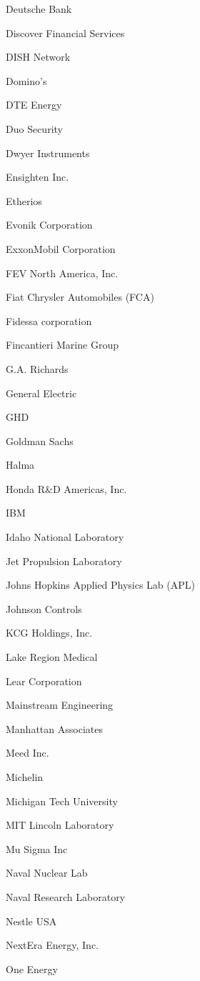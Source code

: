 \documentclass[twoside]{article}
\begin{document}
\begin{center}
\begin{multicols}{5}
\begin{FlushLeft}
\begin{compactitem}
\item Deutsche Bank
\item Discover Financial Services
\item DISH Network
\item Domino's
\item DTE Energy
\item Duo Security
\item Dwyer Instruments
\item Ensighten Inc.
\item Etherios
\item Evonik Corporation
\item ExxonMobil Corporation
\item FEV North America, Inc.
\item Fiat Chrysler Automobiles (FCA)
\item Fidessa corporation
\item Fincantieri Marine Group
\item G.A. Richards
\item General Electric
\item GHD
\item Goldman Sachs
\item Halma
\item Honda R\&D Americas, Inc.
\item IBM
\item Idaho National Laboratory
\item Jet Propulsion Laboratory
\item Johns Hopkins Applied Physics Lab (APL)
\item Johnson Controls
\item KCG Holdings, Inc.
\item Lake Region Medical
\item Lear Corporation
\item Mainstream Engineering
\item Manhattan Associates
\item Meed Inc.
\item Michelin
\item Michigan Tech University
\item MIT Lincoln Laboratory
\item Mu Sigma Inc
\item Naval Nuclear Lab
\item Naval Research Laboratory
\item Nestle USA
\item NextEra Energy, Inc.
\item One Energy

\end{compactitem}
\end{FlushLeft}
\end{multicols}
\end{center}
\end{document}
